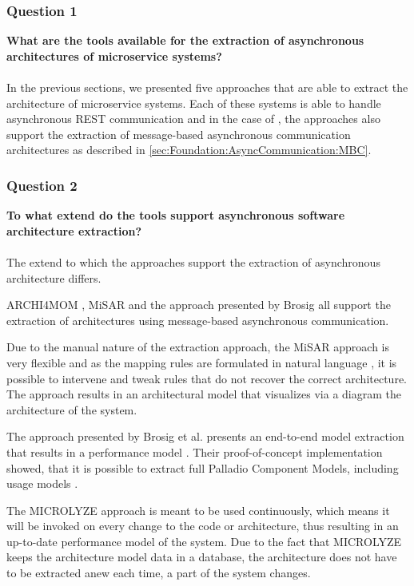 \subsubsection{Question 1}
\textbf{What are the tools available for the extraction of asynchronous architectures of microservice systems?}
\\ \\
In the previous sections, we presented five approaches that are able to extract the architecture of microservice systems.
Each of these systems is able to handle asynchronous REST communication and in the case of \cite{Singh2022ARCHI4MOM,Alshuqayran2018MiSAR,Brosig2011}, the approaches also support the extraction of message-based asynchronous communication architectures as described in \autoref{sec:Foundation:AsyncCommunication:MBC}.

\subsubsection{Question 2}
\textbf{To what extend do the tools support asynchronous software architecture extraction?}
\\ \\
The extend to which the approaches support the extraction of asynchronous architecture differs.

ARCHI4MOM \cite{Singh2022ARCHI4MOM}, MiSAR \cite{Alshuqayran2018MiSAR} and the approach presented by Brosig \cite{Brosig2011} all support the extraction of architectures using message-based asynchronous communication.

Due to the manual nature of the extraction approach, the MiSAR approach is very flexible and as the mapping rules are formulated in natural language \cite{Alshuqayran2020Thesis}, it is possible to intervene and tweak rules that do not recover the correct architecture.
The approach results in an architectural model that visualizes via a diagram the architecture of the system.

The approach presented by Brosig et al. presents an end-to-end model extraction that results in a performance model \cite{Brosig2011}.
Their proof-of-concept implementation showed, that it is possible to extract full Palladio Component Models, including usage models \cite{Brosig2011}.

The MICROLYZE approach is meant to be used continuously, which means it will be invoked on every change to the code or architecture, thus resulting in an up-to-date performance model of the system.
Due to the fact that MICROLYZE keeps the architecture model data in a database, the architecture does not have to be extracted anew each time, a part of the system changes.

